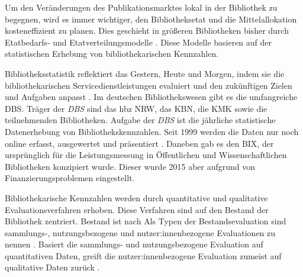 Um den Veränderungen des Publikationsmarktes lokal in der Bibliothek zu begegnen, wird es immer wichtiger, den Bibliotheksetat und die Mittelallokation kosteneffizient zu planen. 
Dies geschieht in größeren Bibliotheken bisher durch Etatbedarfs- und Etatverteilungsmodelle \cite[vgl.][S. 172 ff.]{moravetz-kuhlmann_monika_erwerbungspolitik_2015}.
Diese Modelle basieren auf der statistischen Erhebung von bibliothekarischen Kennzahlen.

Bibliotheksstatistik reflektiert das Gestern, Heute und Morgen, indem 
sie die bibliothekarischen Servicedienstleistungen evaluiert und den zukünftigen Zielen und Aufgaben anpasst \cites[vgl.][462]{laitinen_markku_library_2013}[vgl.][S. 2 f.]{jilovsky_cathie_library_2004}.
Im deutschen Bibliothekswesen gibt es die umfangreiche \acrfull{DBS}. 
Träger der \textit{\acrshort{DBS}} sind das \acrfull{hbz NRW},  das \acrfull{KBN}, die \acrfull{KMK} sowie die teilnehmenden Bibliotheken.
Aufgabe der \textit{\acrshort{DBS}} ist die jährliche statistische Datenerhebung von Bibliothekskennzahlen. 
Seit 1999 werden die Daten nur noch online erfasst, ausgewertet und präsentiert \cite[vgl.][2]{schmidt_deutsche_2008}.
Daneben gab es den \acrfull{BIX}, der ursprünglich für die Leistungsmessung in Öffentlichen und Wissenschaftlichen Bibliotheken konzipiert wurde. 
Dieser wurde 2015 aber aufgrund von Finanzierungsproblemen eingestellt. 

Bibliothekarische Kennzahlen werden durch quantitative und qualitative Evaluationsverfahren erhoben. Diese Verfahren
sind auf den Bestand der Bibliothek zentriert. 
Bestand ist nach \citeauthor{johannsen_jochen_bestands-_2015}
 \cite[252]{johannsen_jochen_bestands-_2015}
Als Typen der Bestandsevaluation sind sammlungs-, nutzungsbezogene und nutzer:innenbezogene Evaluationen zu nennen \cite[vgl.][302]{johnson_peggy_fundamentals_2014}.
Basiert die sammlungs- und nutzungsbezogene Evaluation auf quantitativen Daten, greift die nutzer:innenbezogene Evaluation zumeist auf qualitative Daten zurück \cite[vgl.][S. 461 ff.]{blake_data_2004}.


